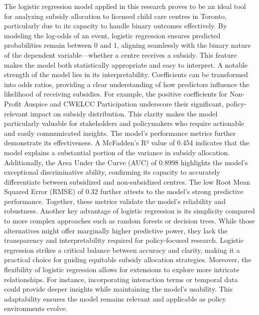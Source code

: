 \documentclass[
  letterpaper,
  DIV=11,
  numbers=noendperiod]{scrartcl}
\begin{document}
The logistic regression model applied in this research proves to be an
ideal tool for analyzing subsidy allocation to licensed child care
centres in Toronto, particularly due to its capacity to handle binary
outcomes effectively. By modeling the log-odds of an event, logistic
regression ensures predicted probabilities remain between 0 and 1,
aligning seamlessly with the binary nature of the dependent
variable---whether a centre receives a subsidy. This feature makes the
model both statistically appropriate and easy to interpret. A notable
strength of the model lies in its interpretability. Coefficients can be
transformed into odds ratios, providing a clear understanding of how
predictors influence the likelihood of receiving subsidies. For example,
the positive coefficients for Non-Profit Auspice and CWELCC
Participation underscore their significant, policy-relevant impact on
subsidy distribution. This clarity makes the model particularly valuable
for stakeholders and policymakers who require actionable and easily
communicated insights. The model's performance metrics further
demonstrate its effectiveness. A McFadden's R² value of 0.454 indicates
that the model explains a substantial portion of the variance in subsidy
allocation. Additionally, the Area Under the Curve (AUC) of 0.8998
highlights the model's exceptional discriminative ability, confirming
its capacity to accurately differentiate between subsidized and
non-subsidized centres. The low Root Mean Squared Error (RMSE) of 0.32
further attests to the model's strong predictive performance. Together,
these metrics validate the model's reliability and robustness. Another
key advantage of logistic regression is its simplicity compared to more
complex approaches such as random forests or decision trees. While those
alternatives might offer marginally higher predictive power, they lack
the transparency and interpretability required for policy-focused
research. Logistic regression strikes a critical balance between
accuracy and clarity, making it a practical choice for guiding equitable
subsidy allocation strategies. Moreover, the flexibility of logistic
regression allows for extensions to explore more intricate
relationships. For instance, incorporating interaction terms or temporal
data could provide deeper insights while maintaining the model's
usability. This adaptability ensures the model remains relevant and
applicable as policy environments evolve.
\end{document}
